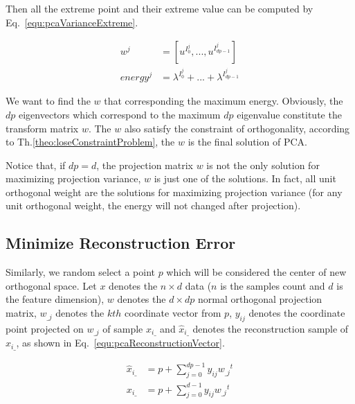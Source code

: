 \documentclass[runningheads,openany]{xhlPaper}
\begin{document}
Then all the extreme point and their extreme value can be computed by Eq.~\ref{equ:pcaVarianceExtreme}.

\begin{equation}
\label{equ:pcaVarianceExtreme}
\begin{aligned}
w^j &= [{u^{{I^{j}_0}}},...,{u^{{I^{j}_{{dp} - 1}}}}]\\
energy^j &= {\lambda ^{{I^{j}_0}}} + ... + {\lambda ^{{I^{j}_{{dp} - 1}}}}
\end{aligned}
\end{equation}

We want to find the $w$ that corresponding the maximum energy. Obviously, the $dp$ eigenvectors which correspond to the maximum $dp$ eigenvalue constitute the transform matrix $w$. The $w$ also satisfy the constraint of orthogonality, according to Th.\ref{theo:loseConstraintProblem}, the $w$ is the final solution of PCA.  

Notice that, if $dp = d$, the projection matrix $w$ is not the only solution for maximizing projection variance, $w$ is just one of the solutions. In fact, all unit orthogonal weight are the solutions for maximizing projection variance (for any unit orthogonal weight, the energy will not changed after projection).

\subsection{Minimize Reconstruction Error}
Similarly, we random select a point $p$ which will be considered the center of new orthogonal space. 
Let $x$ denotes the $n \times d$ data ($n$ is the samples count and $d$ is the feature dimension), $w$ denotes the $d \times dp$ normal orthogonal projection matrix, $w_{\_j}$ denotes the $kth$ coordinate vector from $p$, ${y_{ij}}$ denotes the coordinate point projected on $w_{\_j}$ of sample $x_{i\_}$ and ${{\hat x}_{i\_}}$ denotes the reconstruction sample of $x_{i\_}$, as shown in Eq.~\ref{equ:pcaReconstructionVector}.

\label{sec:pcaMRE}
\begin{equation}
\label{equ:pcaReconstructionVector}
\begin{aligned}
{{\hat x}_{i\_}} &= p + \sum\limits_{j = 0}^{{dp} - 1} {{y_{ij}}{w_{\_j}}^t} \\
{x_{i\_}} &= p + \sum\limits_{j = 0}^{d - 1} {{y_{ij}}{w_{\_j}}^t} 
\end{aligned}
\end{equation}
\end{document}
